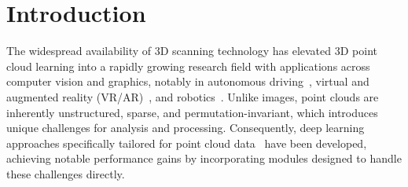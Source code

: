 \section{Introduction}
\label{sec:intro}




The widespread availability of 3D scanning technology has elevated 3D point cloud learning into a rapidly growing research field with applications across computer vision and graphics, notably in autonomous driving~\cite{yang2024visual,song2024graphbev,chen20203d}, virtual and augmented reality (VR/AR)~\cite{casado2023rendering,garrido2021point}, and robotics~\cite{wang2021trajectory,chen2022direct,christen2023learning}. Unlike images, point clouds are inherently unstructured, sparse, and permutation-invariant, which introduces unique challenges for analysis and processing. Consequently, deep learning approaches specifically tailored for point cloud data~\cite{qi2017pointnet, li2018pointcnn, qian2022pointnext, qi2017pointnet++, wang2019dynamic, wu2024point} have been developed, achieving notable performance gains by incorporating modules designed to handle these challenges directly.

